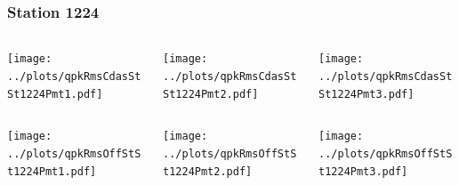 \documentclass[aspectratio=169]{beamer}
\begin{document}
\begin{frame} 
  \frametitle{Station 1224}
  \begin{center}
    \begin{columns}
      \begin{column}{0.33\textwidth}
        \texttt{[image: ../plots/qpkRmsCdasStSt1224Pmt1.pdf]}
      \end{column}
      \begin{column}{0.33\textwidth}
        \texttt{[image: ../plots/qpkRmsCdasStSt1224Pmt2.pdf]}
      \end{column}
      \begin{column}{0.33\textwidth}
        \texttt{[image: ../plots/qpkRmsCdasStSt1224Pmt3.pdf]}
      \end{column}
    \end{columns}
  \end{center}

  \begin{center}
    \begin{columns}
      \begin{column}{0.33\textwidth}
        \texttt{[image: ../plots/qpkRmsOffStSt1224Pmt1.pdf]}
      \end{column}
      \begin{column}{0.33\textwidth}
        \texttt{[image: ../plots/qpkRmsOffStSt1224Pmt2.pdf]}
      \end{column}
      \begin{column}{0.33\textwidth}
        \texttt{[image: ../plots/qpkRmsOffStSt1224Pmt3.pdf]}
      \end{column}
    \end{columns}
  \end{center}
\end{frame}
\end{document}
